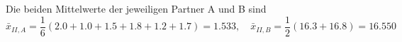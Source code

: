 Die beiden Mittelwerte der jeweiligen Partner A und B sind
 \begin{equation}
 \bar x_{II,A} = \frac{1}{6}\left( 2.0 + 1.0 + 1.5 + 1.8 + 1.2 + 1.7 \right) = 1.533,
\quad \bar x_{II,B} = \frac{1}{2}\left( 16.3 + 16.8 \right) = 16.550
 \label{eq:Mittelwerte_x_II_A_B}
 \end{equation}

\begin{comment}

\textcolor{red}{\textbf{Dieses würde ich hier an dieser Stelle gar nicht bringen, auch wenn es in Pau82
so präsentiert wird, weil Du ja hier in diesem Skript schon mit den Gewichten als Kehrwert
der Varianzen für den Referenzwert, der aus dem gewichteten Mittel der Resultate aller Partner
gewonnen wurde, um En-Werte für gleiche Partner zu bestimmen.}}


\textcolor{red}{zunächst hatte ich entlang am Pau82 die Sachen so nachgerechnet und verstanden, wie
Paule und Mandel sie argumentiert hatte, dann wurde mir langsam klar, dass wir in unseren Vorlesungen
aber längst an dem Punkt angekommen sind, dass man die Kehrwerte der Varianzen nimmt und nicht
anfängt die Mittelwerte einfach zu mitteln $\Rightarrow$ alles Blaue hiernach hier wegnehmen}

\textcolor{blue}{und der Mittelwert dieser beiden Mittelwerte ist
 \begin{equation}
  \bar x_{II,AB} = \frac{1}{2}\left( 1.533 + 16.550 \right) = 9.0417
 \label{eq:Mittelwerte_x_IIAB}
 \end{equation}
 Dadurch dass wir Mittelwerte mitteln erhalten wir eine andere Wichtung: $\frac{\sum w_i x_i}{\sum w_i}$:
$$
\frac{1}{2} \left( \frac{1}{6} \left(\sum\limits_{i=1}^6 x_i \right) \; + \;
    \frac{1}{2} \left(\sum\limits_{i=7}^8 x_i \right)  \right) =
 \frac{1}{12} \left(\sum\limits_{i=1}^6 x_i \right) \; + \;
    \frac{1}{4} \left(\sum\limits_{i=7}^8 x_i \right)
$$
also
$$
\frac{w_i}{\sum\limits_{i=1}^8 w_i} \, = \,
\left\{ \begin{array}{ccl}
\frac{1}{12} & \text{f{\"u}r} & i = 1,\dots,6 \\
\frac{1}{4} & \text{f{\"u}r} & i = 7, 8
\end{array} \right.
$$
Diese Art der Wichtung, die Einzelwerte zu gewichten, führt dazu dass Stichprobe B
sehr viel stärker gewichtet wird, in diesem Beispiel um einen Faktor $3$ mit $\frac{1}{4} = \frac{3}{12}$.
Es macht jedoch mehr Sinn, die Gewichte danach zu richten, wie genau die Größen sind,
im Sinne von der Frage wie breit oder schmal die Wahrscheinlichkeitsdichteverteilung ist.}
\end{comment}

